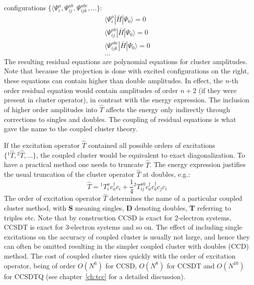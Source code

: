 configurations $\{ \langle \Psi_{i}^{a}, \Psi_{ij}^{ab}, \Psi_{ijk}^{abc}, 
\ldots \}$: 
%
\begin{equation}
\begin{aligned}
 \langle{\Psi_{i}^{a}} | \bar{H} | \Psi_{0} \rangle = 0 \\
 \langle{\Psi_{ij}^{ab}} | \bar{H} | \Psi_{0} \rangle = 0  \\
 \langle{\Psi_{ijk}^{abc}} | \bar{H} | \Psi_{0} \rangle = 0 \\
 \ldots
\end{aligned}
\label{eq:residuals}
\end{equation}
%
The resulting residual equations are polynomial equations for cluster 
amplitudes. Note that because the projection is done with excited 
configurations on the right, these equations can contain higher than double 
amplitudes. In effect, the $n$-th order residual equation would contain 
amplitudes of order $n + 2$ (if they were present in cluster operator), in 
contrast with the energy expression. The inclusion of higher order amplitudes 
into $\hat{T}$ affects the energy only indirectly through corrections to 
singles and doubles. The coupling of residual equations is what gave the name 
to the coupled cluster theory.

If the excitation operator $\hat{T}$ contained all possible orders of 
excitations~$\{ {}^{1}\hat{T}, {}^{2}\hat{T}, \ldots \}$, 
the coupled cluster would be equivalent to exact diagonalization. To have a 
practical method one needs to truncate $\hat{T}$. The energy expression 
justifies the usual truncation of the cluster operator 
$\hat{T}$ at doubles, e.g.:
%
\begin{equation}
 \hat{T} =  {}^{1}T_{i}^{a} c^{\dagger}_{a} c_{i} + \frac{1}{4} {}^2T_{ij}^{ab} 
c^{\dagger}_{a} c^{\dagger}_{b} c_{j} c_{i}
\end{equation}
%
The order of excitation operator $\hat{T}$ determines the name of a particular 
coupled cluster method, with \textbf{S} meaning singles, \textbf{D} denoting 
doubles, \textbf{T} referring to triples etc. Note that by construction CCSD is 
exact for 2-electron systems, CCSDT is exact for 3-electron systems and so on. 
The effect of including single excitations on the accuracy of coupled cluster 
is usually not large, and hence they can often be omitted resulting in the 
simpler coupled cluster with doubles (CCD) method. The cost of coupled cluster 
rises quickly with the order of excitation operator, being of order $O(N^6)$ 
for CCSD, $O(N^8)$ for CCSDT and $O(N^{10})$ for CCSDTQ (see 
chapter~\ref{ch:tcc} for a detailed discussion).

